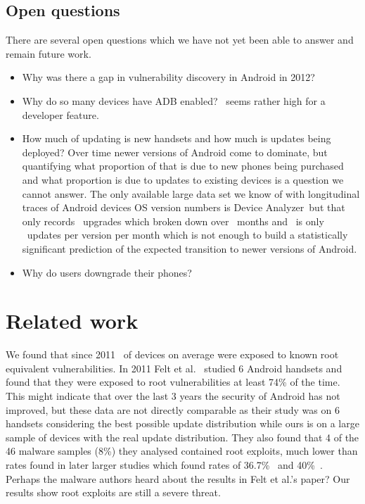 \documentclass[conference,a4paper,twoside]{IEEEtran}
\newcommand{\da}{Device Analyzer}
\begin{document}
\subsection{Open questions}
There are several open questions which we have not yet been able to answer and remain future work.
\begin{itemize}
 \item Why was there a gap in vulnerability discovery in Android in 2012?
 \item Why do so many devices have ADB enabled? \daAdbEnabledPerc\ seems rather high for a developer feature.
 \item How much of updating is new handsets and how much is updates being deployed? Over time newer versions of Android come to dominate, but quantifying what proportion of that is due to new phones being purchased and what proportion is due to updates to existing devices is a question we cannot answer.
 The only available large data set we know of with longitudinal traces of Android devices OS version numbers is \da\ but that only records \daNumUpdatesUpgrades\ upgrades which broken down over \daOSMonthsOfData\ months and \daNumSigOSVersions\ is only \daUpdatesPerMonthPerVersion\ updates per version per month which is not enough to build a statistically significant prediction of the expected transition to newer versions of Android.
 \item Why do users downgrade their phones?
\end{itemize}


\section{Related work}
\label{sec:related}
We found that since 2011 \daMeanInsecurityPerc\ of devices on average were exposed to known root equivalent vulnerabilities.
In 2011 Felt et al.\ \cite{Felt2011} studied 6 Android handsets and found that they were exposed to root vulnerabilities at least 74\% of the time.
This might indicate that over the last 3 years the security of Android has not improved, but these data are not directly comparable as their study was on 6 handsets considering the best possible update distribution while ours is on a large sample of devices with the real update distribution.
They also found that 4 of the 46 malware samples (8\%) they analysed contained root exploits, much lower than rates found in later larger studies which found rates of 36.7\%~\cite{Zhou2012b} and 40\%~\cite{Zhou2012a}.
Perhaps the malware authors heard about the results in Felt et al.'s paper?
Our results show root exploits are still a severe threat.
\end{document}
